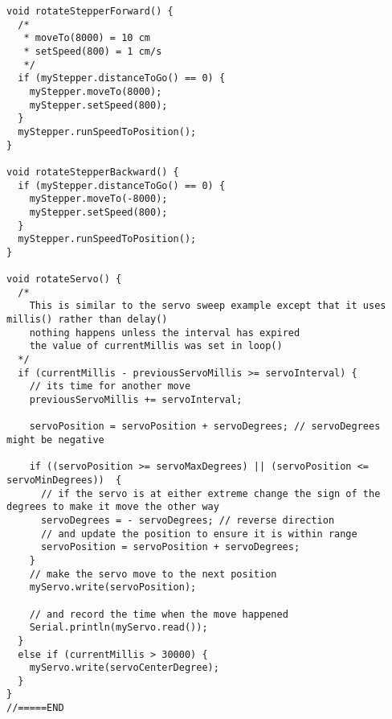 \begin{lstlisting}[caption={Code for traversing module in Arduino}]
void rotateStepperForward() {
  /*
   * moveTo(8000) = 10 cm
   * setSpeed(800) = 1 cm/s
   */
  if (myStepper.distanceToGo() == 0) {
    myStepper.moveTo(8000);
    myStepper.setSpeed(800);
  }
  myStepper.runSpeedToPosition();
}

void rotateStepperBackward() {
  if (myStepper.distanceToGo() == 0) {
    myStepper.moveTo(-8000);
    myStepper.setSpeed(800);
  }
  myStepper.runSpeedToPosition();
}

void rotateServo() {
  /*
    This is similar to the servo sweep example except that it uses millis() rather than delay()
    nothing happens unless the interval has expired
    the value of currentMillis was set in loop()
  */
  if (currentMillis - previousServoMillis >= servoInterval) {
    // its time for another move
    previousServoMillis += servoInterval;

    servoPosition = servoPosition + servoDegrees; // servoDegrees might be negative

    if ((servoPosition >= servoMaxDegrees) || (servoPosition <= servoMinDegrees))  {
      // if the servo is at either extreme change the sign of the degrees to make it move the other way
      servoDegrees = - servoDegrees; // reverse direction
      // and update the position to ensure it is within range
      servoPosition = servoPosition + servoDegrees;
    }
    // make the servo move to the next position
    myServo.write(servoPosition);

    // and record the time when the move happened
    Serial.println(myServo.read());
  }
  else if (currentMillis > 30000) {
    myServo.write(servoCenterDegree);
  }
}
//=====END
\end{lstlisting}
